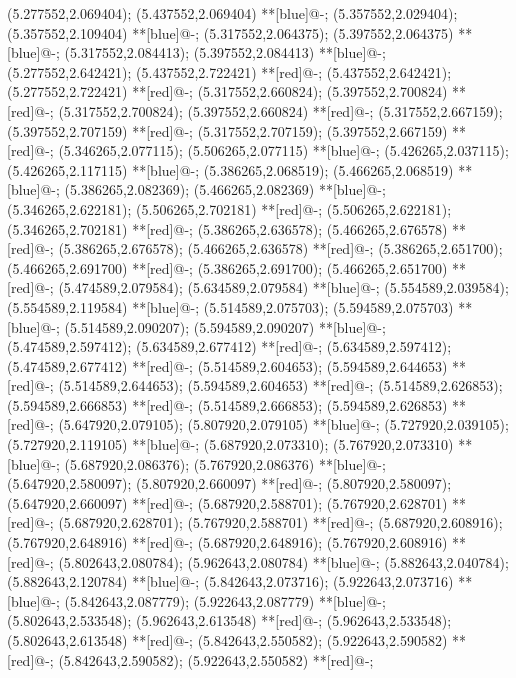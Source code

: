 (5.277552,2.069404); (5.437552,2.069404) **[blue]@{-};
(5.357552,2.029404); (5.357552,2.109404) **[blue]@{-};
(5.317552,2.064375); (5.397552,2.064375) **[blue]@{-};
(5.317552,2.084413); (5.397552,2.084413) **[blue]@{-};
(5.277552,2.642421); (5.437552,2.722421) **[red]@{-};
(5.437552,2.642421); (5.277552,2.722421) **[red]@{-};
(5.317552,2.660824); (5.397552,2.700824) **[red]@{-};
(5.317552,2.700824); (5.397552,2.660824) **[red]@{-};
(5.317552,2.667159); (5.397552,2.707159) **[red]@{-};
(5.317552,2.707159); (5.397552,2.667159) **[red]@{-};
(5.346265,2.077115); (5.506265,2.077115) **[blue]@{-};
(5.426265,2.037115); (5.426265,2.117115) **[blue]@{-};
(5.386265,2.068519); (5.466265,2.068519) **[blue]@{-};
(5.386265,2.082369); (5.466265,2.082369) **[blue]@{-};
(5.346265,2.622181); (5.506265,2.702181) **[red]@{-};
(5.506265,2.622181); (5.346265,2.702181) **[red]@{-};
(5.386265,2.636578); (5.466265,2.676578) **[red]@{-};
(5.386265,2.676578); (5.466265,2.636578) **[red]@{-};
(5.386265,2.651700); (5.466265,2.691700) **[red]@{-};
(5.386265,2.691700); (5.466265,2.651700) **[red]@{-};
(5.474589,2.079584); (5.634589,2.079584) **[blue]@{-};
(5.554589,2.039584); (5.554589,2.119584) **[blue]@{-};
(5.514589,2.075703); (5.594589,2.075703) **[blue]@{-};
(5.514589,2.090207); (5.594589,2.090207) **[blue]@{-};
(5.474589,2.597412); (5.634589,2.677412) **[red]@{-};
(5.634589,2.597412); (5.474589,2.677412) **[red]@{-};
(5.514589,2.604653); (5.594589,2.644653) **[red]@{-};
(5.514589,2.644653); (5.594589,2.604653) **[red]@{-};
(5.514589,2.626853); (5.594589,2.666853) **[red]@{-};
(5.514589,2.666853); (5.594589,2.626853) **[red]@{-};
(5.647920,2.079105); (5.807920,2.079105) **[blue]@{-};
(5.727920,2.039105); (5.727920,2.119105) **[blue]@{-};
(5.687920,2.073310); (5.767920,2.073310) **[blue]@{-};
(5.687920,2.086376); (5.767920,2.086376) **[blue]@{-};
(5.647920,2.580097); (5.807920,2.660097) **[red]@{-};
(5.807920,2.580097); (5.647920,2.660097) **[red]@{-};
(5.687920,2.588701); (5.767920,2.628701) **[red]@{-};
(5.687920,2.628701); (5.767920,2.588701) **[red]@{-};
(5.687920,2.608916); (5.767920,2.648916) **[red]@{-};
(5.687920,2.648916); (5.767920,2.608916) **[red]@{-};
(5.802643,2.080784); (5.962643,2.080784) **[blue]@{-};
(5.882643,2.040784); (5.882643,2.120784) **[blue]@{-};
(5.842643,2.073716); (5.922643,2.073716) **[blue]@{-};
(5.842643,2.087779); (5.922643,2.087779) **[blue]@{-};
(5.802643,2.533548); (5.962643,2.613548) **[red]@{-};
(5.962643,2.533548); (5.802643,2.613548) **[red]@{-};
(5.842643,2.550582); (5.922643,2.590582) **[red]@{-};
(5.842643,2.590582); (5.922643,2.550582) **[red]@{-};
